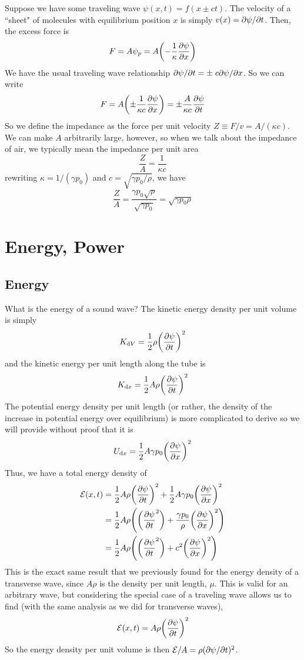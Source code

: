 Suppose we have some traveling wave $\psi(x,t) = f(x \pm ct)$. The velocity of a ``sheet" of molecules with equilibrium position $x$ is simply $v(x) = \partial \psi/\partial t$. Then, the excess force is
\[ F = A\psi_p = A\pqty{-\frac{1}{\kappa}\pdv{\psi}{x}}\]
We have the usual traveling wave relationship $\partial \psi/\partial t = \pm\;  c\partial \psi/\partial x$. So we can write
\[ F = A\pqty{\pm \frac{1}{\kappa c}\pdv{\psi}{x}} = \pm \frac{A}{\kappa c} \pdv{\psi}{t} \]
So we define the impedance as the force per unit velocity $Z \equiv F/v = A/(\kappa c)$. We can make $A$ arbitrarily large, however, so when we talk about the impedance of air, we typically mean the impedance per unit area 
\[ \frac{Z}{A} = \frac{1}{\kappa c}\]
rewriting $\kappa = 1/(\gamma p_0)$ and $c = \sqrt{\gamma p_0/\rho}$, we have
\[ \frac{Z}{A} = \frac{\gamma p_0\sqrt \rho}{\sqrt{\gamma p_0}} = \sqrt{\gamma p_0\rho} \]
\section{Energy, Power}
\subsection*{Energy}
What is the energy of a sound wave? The kinetic energy density per unit volume is simply 
\[ K_{\dd V} = \frac{1}{2}\rho \pqty{\pdv{\psi}{t}}^2\]
and the kinetic energy per unit length along the tube is
\[ K_{\dd x} = \frac{1}{2}A\rho \pqty{\pdv{\psi}{t}}^2 \]
The potential energy density per unit length (or rather, the density of the increase in potential energy over equilibrium) is more complicated to derive so we will provide without proof that it is
\[ U_{\dd x} = \frac{1}{2} A\gamma p_0 \pqty{\pdv{\psi}{x}}^2 \]
Thus, we have a total energy density of 
\begin{align*}
    \mcl E(x,t) &= \frac{1}{2}A\rho \pqty{\pdv{\psi}{t}}^2 + \frac{1}{2}A\gamma  p_0\pqty{\pdv{\psi}{x}}^2 \\
    &= \frac{1}{2}A\rho \pqty{\pqty{\pdv{\psi}{t}^2} + \frac{\gamma p_0}{\rho}\pqty{\pdv{\psi}{x}}^2} \\
    &= \frac{1}{2}A\rho \pqty{\pqty{\pdv{\psi}{t}^2} + c^2 \pqty{\pdv{\psi}{x}}^2}
\end{align*}
This is the exact same result that we previously found for the energy density of a transverse wave, since $A\rho$ is the density per unit length, $\mu$. This is valid for an arbitrary wave, but considering the special case of a traveling wave allows us to find (with the same analysis as we did for transverse waves),
\[ \mcl E(x,t) = A\rho\pqty{\pdv{\psi}{t}}^2\]
So the energy density per unit volume is then $\mathcal{E}/A = \rho (\partial \psi/\partial t)^2$.
